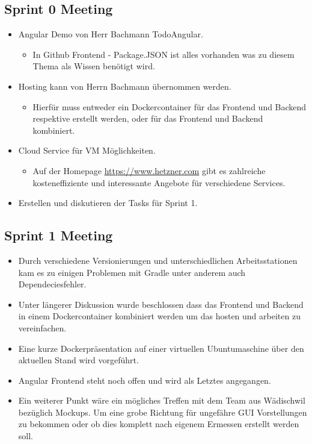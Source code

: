 \documentclass[a4paper]{article}
\begin{document}
	\subsection{Sprint 0 Meeting}
	\begin{itemize}
		\item Angular Demo von  Herr Bachmann TodoAngular.
		\begin{itemize}
			\item In Github Frontend - Package.JSON ist alles vorhanden was zu diesem Thema als Wissen benötigt wird.
		\end{itemize}
		\item Hosting kann von Herrn Bachmann übernommen werden.
		\begin{itemize}
			\item Hierfür muss entweder ein Dockercontainer für das Frontend und Backend respektive erstellt werden, oder für das Frontend und Backend kombiniert.
		\end{itemize}
		\item Cloud Service für VM Möglichkeiten.
		\begin{itemize}
			\item Auf der Homepage \url{https://www.hetzner.com} gibt es zahlreiche kosteneffiziente und interessante Angebote für verschiedene Services.
		\end{itemize}
		\item Erstellen und diskutieren der Tasks für Sprint 1.
	\end{itemize}	
	
	\subsection{Sprint 1 Meeting}
	\begin{itemize}
		\item Durch verschiedene Versionierungen und unterschiedlichen Arbeitsstationen kam es zu einigen Problemen mit Gradle unter anderem auch Dependeciesfehler.
		\item Unter längerer Diskussion wurde beschlossen dass das Frontend und Backend in einem Dockercontainer kombiniert werden um das hosten und arbeiten zu vereinfachen.
		\item Eine kurze Dockerpräsentation auf einer virtuellen Ubuntumaschine über den aktuellen Stand wird vorgeführt.
		\item Angular Frontend steht noch offen und wird als Letztes angegangen.
		\item Ein weiterer Punkt wäre ein mögliches Treffen mit dem Team aus Wädischwil bezüglich Mockups. Um eine grobe Richtung für ungefähre GUI Vorstellungen zu bekommen oder ob dies komplett nach eigenem Ermessen erstellt werden soll.
	\end{itemize}	
\end{document}
